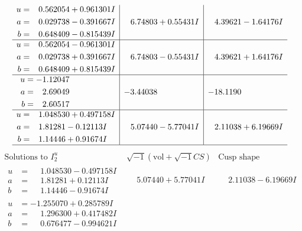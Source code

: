 \documentclass[1p]{elsarticle_modified}
\theoremstyle{definition}
\newcommand{\I}{\sqrt{-1}}
\begin{document}
$$\begin{array}{c|c|c}
\begin{aligned}
u &= \phantom{-}0.562054 + 0.961301 I \\
a &= \phantom{-}0.029738 - 0.391667 I \\
b &= \phantom{-}0.648409 - 0.815439 I\end{aligned}
 & \phantom{-}6.74803 + 0.55431 I & \phantom{-}4.39621 - 1.64176 I \\ \hline\begin{aligned}
u &= \phantom{-}0.562054 - 0.961301 I \\
a &= \phantom{-}0.029738 + 0.391667 I \\
b &= \phantom{-}0.648409 + 0.815439 I\end{aligned}
 & \phantom{-}6.74803 - 0.55431 I & \phantom{-}4.39621 + 1.64176 I \\ \hline\begin{aligned}
u &= -1.12047\phantom{ +0.000000I} \\
a &= \phantom{-}2.69049\phantom{ +0.000000I} \\
b &= \phantom{-}2.60517\phantom{ +0.000000I}\end{aligned}
 & -3.44038\phantom{ +0.000000I} & -18.1190\phantom{ +0.000000I} \\ \hline\begin{aligned}
u &= \phantom{-}1.048530 + 0.497158 I \\
a &= \phantom{-}1.81281 - 0.12113 I \\
b &= \phantom{-}1.14446 + 0.91674 I\end{aligned}
 & \phantom{-}5.07440 - 5.77041 I & \phantom{-}2.11038 + 6.19669 I\\
 \hline 
 \end{array}$$\newpage$$\begin{array}{c|c|c}  
\text{Solutions to }I^u_{2}& \I (\text{vol} + \sqrt{-1}CS) & \text{Cusp shape}\\
 \hline 
\begin{aligned}
u &= \phantom{-}1.048530 - 0.497158 I \\
a &= \phantom{-}1.81281 + 0.12113 I \\
b &= \phantom{-}1.14446 - 0.91674 I\end{aligned}
 & \phantom{-}5.07440 + 5.77041 I & \phantom{-}2.11038 - 6.19669 I \\ \hline\begin{aligned}
u &= -1.255070 + 0.285789 I \\
a &= \phantom{-}1.296300 + 0.417482 I \\
b &= \phantom{-}0.676477 - 0.994621 I\end{aligned}

\end{array}$$
\end{document}
